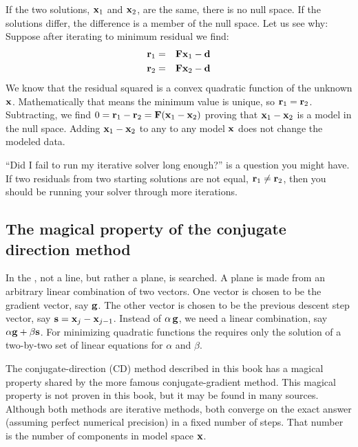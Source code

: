 If the two solutions,
$\bold x_1$ and $\bold x_2$,
are the same, there is no null space.
If the solutions differ, the difference
is a member of the null space.
Let us see why:
Suppose after iterating to minimum residual we find:
\begin{eqnarray}
\bold r_1 &=& \bold F\bold x_1 - \bold d
\\
\bold r_2 &=& \bold F\bold x_2 - \bold d 
\end{eqnarray}
We know that the residual squared is a convex quadratic function
of the unknown $\bold x$.
Mathematically that means the minimum value is unique,
so $\bold r_1 =\bold r_2$.
Subtracting,
we find
$0=\bold r_1-\bold r_2 =\bold F(\bold x_1-\bold x_2)$
proving that $\bold x_1-\bold x_2$ is a model in the null space.
Adding $\bold x_1-\bold x_2$ to any to any model $\bold x$
does not change the modeled data.

\par
{}
\par
``Did I fail to run my iterative solver long enough?'' is
a question you might have.
If two residuals from two starting solutions are not equal,
$\bold r_1 \ne \bold r_2$,
then you should be running your solver through more iterations.
\par
{}

\subsection{The magical property of the conjugate direction method}
In the , not a line, but rather a plane,
is searched.
A plane is made from an arbitrary linear combination of two vectors.
One vector is chosen to be the gradient vector, say  $\bold g$.
The other vector is chosen to be the previous descent step vector,
say  $\bold s = \bold x_j - \bold x_{j-1}$.
Instead of  $\alpha \, \bold g$,  we need a linear combination,
say  $\alpha \bold g + \beta  \bold s$.
For minimizing quadratic functions the  requires
only the solution of a two-by-two set of linear equations
for  $\alpha$  and  $\beta$.
\par
The conjugate-direction (CD) method described in this book
has a magical property shared by the more famous conjugate-gradient method.
This magical property is not proven in this book,
but it may be found in many sources.
Although both methods are iterative methods,
both converge on the exact answer (assuming perfect numerical precision)
in a fixed number of steps.
That number is the number of components in model space $\bold x$.

